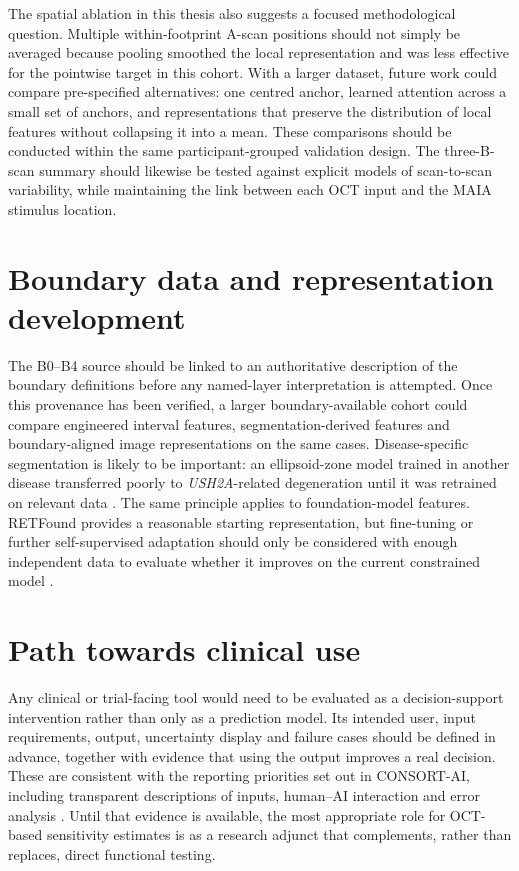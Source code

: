 The spatial ablation in this thesis also suggests a focused methodological question. Multiple within-footprint A-scan positions should not simply be averaged because pooling smoothed the local representation and was less effective for the pointwise target in this cohort. With a larger dataset, future work could compare pre-specified alternatives: one centred anchor, learned attention across a small set of anchors, and representations that preserve the distribution of local features without collapsing it into a mean. These comparisons should be conducted within the same participant-grouped validation design. The three-B-scan summary should likewise be tested against explicit models of scan-to-scan variability, while maintaining the link between each OCT input and the MAIA stimulus location.

\section{Boundary data and representation development}

The B0--B4 source should be linked to an authoritative description of the boundary definitions before any named-layer interpretation is attempted. Once this provenance has been verified, a larger boundary-available cohort could compare engineered interval features, segmentation-derived features and boundary-aligned image representations on the same cases. Disease-specific segmentation is likely to be important: an ellipsoid-zone model trained in another disease transferred poorly to \textit{USH2A}-related degeneration until it was retrained on relevant data \citep{Loo2022}. The same principle applies to foundation-model features. RETFound provides a reasonable starting representation, but fine-tuning or further self-supervised adaptation should only be considered with enough independent data to evaluate whether it improves on the current constrained model \citep{Zhou2023RETFound,Gholami2024}.

\section{Path towards clinical use}

Any clinical or trial-facing tool would need to be evaluated as a decision-support intervention rather than only as a prediction model. Its intended user, input requirements, output, uncertainty display and failure cases should be defined in advance, together with evidence that using the output improves a real decision. These are consistent with the reporting priorities set out in CONSORT-AI, including transparent descriptions of inputs, human--AI interaction and error analysis \citep{Liu2020}. Until that evidence is available, the most appropriate role for OCT-based sensitivity estimates is as a research adjunct that complements, rather than replaces, direct functional testing.
